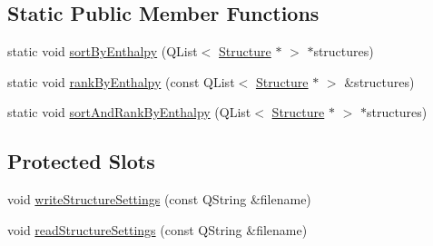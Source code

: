 \subsection*{Static Public Member Functions}
\begin{DoxyCompactItemize}
\item 
static void \hyperlink{classGlobalSearch_1_1Structure_a58d72124caf9401902f6a7653e0e7646}{sort\-By\-Enthalpy} (Q\-List$<$ \hyperlink{classGlobalSearch_1_1Structure}{Structure} $\ast$ $>$ $\ast$structures)
\item 
static void \hyperlink{classGlobalSearch_1_1Structure_af258714834ae664a9a563f1f0af4a883}{rank\-By\-Enthalpy} (const Q\-List$<$ \hyperlink{classGlobalSearch_1_1Structure}{Structure} $\ast$ $>$ \&structures)
\item 
static void \hyperlink{classGlobalSearch_1_1Structure_a742dbf63765f00c205657366f7e5efc8}{sort\-And\-Rank\-By\-Enthalpy} (Q\-List$<$ \hyperlink{classGlobalSearch_1_1Structure}{Structure} $\ast$ $>$ $\ast$structures)
\end{DoxyCompactItemize}
\subsection*{Protected Slots}
\begin{DoxyCompactItemize}
\item 
void \hyperlink{classGlobalSearch_1_1Structure_aa38396dff22066272e3b47604c9ac527}{write\-Structure\-Settings} (const Q\-String \&filename)
\item 
void \hyperlink{classGlobalSearch_1_1Structure_abe87722af78ae2e5913aebd7ae91ae6d}{read\-Structure\-Settings} (const Q\-String \&filename)
\end{DoxyCompactItemize}


